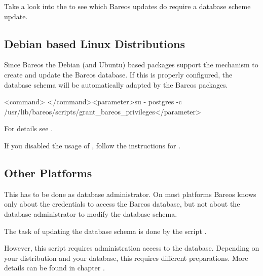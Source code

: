 Take a look into the  to see which Bareos updates do require a database scheme update.




\subsection{Debian based Linux Distributions}

Since Bareos  the Debian (and Ubuntu) based packages support the  mechanism to create and update the Bareos database.
If this is properly configured, the database schema will be automatically adapted by the Bareos packages.

\begin{commands}{}
<command> </command><parameter>su - postgres -c /usr/lib/bareos/scripts/grant_bareos_privileges</parameter>
\end{commands}
For details see .

If you disabled the usage of , 
follow the instructions for .

\subsection{Other Platforms}
    \label{sec:UpdateDatabaseOtherDistributions}

This has to be done as database administrator.
On most platforms Bareos knows only about the credentials to access the Bareos database,
but not about the database administrator to modify the database schema.

The task of updating the database schema is done by the script
.

However, this script requires administration access to the database.
Depending on your distribution and your database, this requires different preparations.
More details can be found in chapter .

